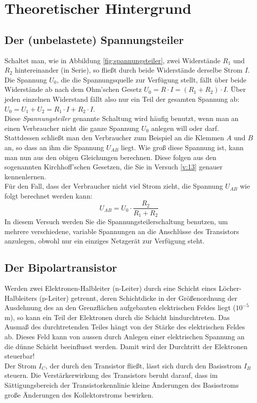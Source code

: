 \section{Theoretischer Hintergrund}

\subsection{Der (unbelastete) Spannungsteiler}


Schaltet man, wie in Abbildung \ref{fig:spannungsteiler}, zwei Widerstände $R_1$ und $R_2$ hintereinander (in Serie), so fließt durch beide Widerstände derselbe Strom $I$. Die Spannung $U_0$, die die Spannungsquelle zur Verfügung stellt, fällt über beide Widerstände ab nach dem Ohm'schen Gesetz $U_0 = R\cdot I = \left( R_1 + R_2\right)\cdot I$. Über jeden einzelnen Widerstand fällt also nur ein Teil der gesamten Spannung ab: $U_0 = U_1 + U_2 = R_1\cdot I + R_2\cdot I$.\\
Diese \textit{Spannungsteiler} genannte Schaltung wird häufig benutzt, wenn man an einen Verbraucher nicht die ganze Spannung $U_0$ anlegen will oder darf. Stattdessen schließt man den Verbraucher zum Beispiel an die Klemmen $A$ und $B$ an, so dass an ihm die Spannung $U_{AB}$ liegt. Wie groß diese Spannung ist, kann man nun aus den obigen Gleichungen berechnen. Diese folgen aus den sogenannten Kirchhoff'schen Gesetzen, die Sie in Versuch \ref{v:13} genauer kennenlernen.\\
Für den Fall, dass der Verbraucher nicht viel Strom zieht, die Spannung $U_{AB}$ wie folgt berechnet werden kann:
\begin{equation}
	U_{AB} = U_0\cdot\frac{R_2}{R_1 + R_2}
\end{equation}
In diesem Versuch werden Sie die Spannungsteilerschaltung benutzen, um mehrere verschiedene, variable Spannungen an die Anschlüsse des Transistors anzulegen, obwohl nur ein einziges Netzgerät zur Verfügung steht.

\subsection{Der Bipolartransistor}

Werden zwei Elektronen-Halbleiter (n-Leiter) durch eine Schicht eines Löcher-Halbleiters (p-Leiter) getrennt, deren Schichtdicke in der Größenordnung der Ausdehnung des an den Grenzflächen aufgebauten elektrischen Feldes liegt 
($10^{-5}$ m), so kann ein Teil der Elektronen durch die Schicht hindurchtreten. Das Ausmaß des durchtretenden Teiles hängt von der Stärke des elektrischen Feldes ab. Dieses Feld kann von aussen durch Anlegen einer elektrischen Spannung an die dünne Schicht beeinflusst werden. Damit wird der Durchtritt der Elektronen steuerbar!\\
Der Strom $I_C$, der durch den Transistor fließt, lässt sich durch den Basisstrom $I_B$ steuern. Die Verstärkerwirkung des Transistors beruht darauf, dass im Sättigungsbereich der Transistorkennlinie kleine Änderungen des Basisstroms große Änderungen des Kollektorstroms bewirken.\\

